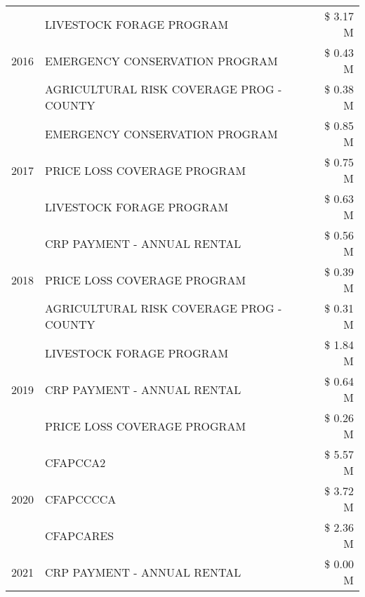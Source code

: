 \begin{tabular}{llr}
\cline{1-3}
\multirow[t]{3}{*}{2016} & LIVESTOCK FORAGE PROGRAM & \$ 3.17 M \\
 & EMERGENCY CONSERVATION PROGRAM & \$ 0.43 M \\
 & AGRICULTURAL RISK COVERAGE PROG - COUNTY & \$ 0.38 M \\
\cline{1-3}
\multirow[t]{3}{*}{2017} & EMERGENCY CONSERVATION PROGRAM & \$ 0.85 M \\
 & PRICE LOSS COVERAGE PROGRAM & \$ 0.75 M \\
 & LIVESTOCK FORAGE PROGRAM & \$ 0.63 M \\
\cline{1-3}
\multirow[t]{3}{*}{2018} & CRP PAYMENT - ANNUAL RENTAL & \$ 0.56 M \\
 & PRICE LOSS COVERAGE PROGRAM & \$ 0.39 M \\
 & AGRICULTURAL RISK COVERAGE PROG - COUNTY & \$ 0.31 M \\
\cline{1-3}
\multirow[t]{3}{*}{2019} & LIVESTOCK FORAGE PROGRAM & \$ 1.84 M \\
 & CRP PAYMENT - ANNUAL RENTAL & \$ 0.64 M \\
 & PRICE LOSS COVERAGE PROGRAM & \$ 0.26 M \\
\cline{1-3}
\multirow[t]{3}{*}{2020} & CFAPCCA2 & \$ 5.57 M \\
 & CFAPCCCCA & \$ 3.72 M \\
 & CFAPCARES & \$ 2.36 M \\
\cline{1-3}
2021 & CRP PAYMENT - ANNUAL RENTAL & \$ 0.00 M \\
\cline{1-3}
\bottomrule
\end{tabular}
